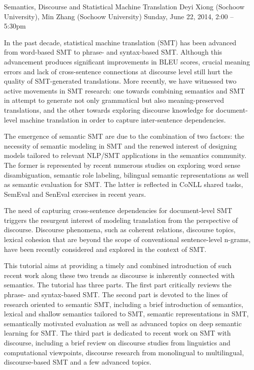 \begin{tutorial}{Semantics, Discourse and Statistical Machine Translation}
  {Deyi Xiong (Sochoow University), Min Zhang (Sochoow University)}
  {Sunday, June 22, 2014, 2:00 -- 5:30pm}
  {\TutLocG}

In the past decade, statistical machine translation (SMT) has been advanced from word-based SMT to phrase- and syntax-based SMT. Although this advancement produces significant improvements in BLEU scores, crucial meaning errors and lack of cross-sentence connections at discourse level still hurt the quality of SMT-generated translations. More recently, we have witnessed two active movements in SMT research: one towards combining semantics and SMT in attempt to generate not only grammatical but also meaning-preserved translations, and the other towards exploring discourse knowledge for document-level machine translation in order to capture inter-sentence dependencies.

The emergence of semantic SMT are due to the combination of two factors: the necessity of semantic modeling in SMT and the renewed interest of designing models tailored to relevant NLP/SMT applications in the semantics community. The former is represented by recent numerous studies on exploring word sense disambiguation, semantic role labeling, bilingual semantic representations as well as semantic evaluation for SMT. The latter is reflected in CoNLL shared tasks, SemEval and SenEval exercises in recent years.

The need of capturing cross-sentence dependencies for document-level SMT triggers the resurgent interest of modeling translation from the perspective of discourse. Discourse phenomena, such as coherent relations, discourse topics, lexical cohesion that are beyond the scope of conventional sentence-level n-grams, have been recently considered and explored in the context of SMT.

This tutorial aims at providing a timely and combined introduction of such recent work along these two trends as discourse is inherently connected with semantics. The tutorial has three parts. The first part critically reviews the phrase- and syntax-based SMT. The second part is devoted to the lines of research oriented to semantic SMT, including a brief introduction of semantics, lexical and shallow semantics tailored to SMT, semantic representations in SMT, semantically motivated evaluation as well as advanced topics on deep semantic learning for SMT. The third part is dedicated to recent work on SMT with discourse, including a brief review on discourse studies from linguistics and computational viewpoints, discourse research from monolingual to multilingual, discourse-based SMT and a few advanced topics.


\end{tutorial}
